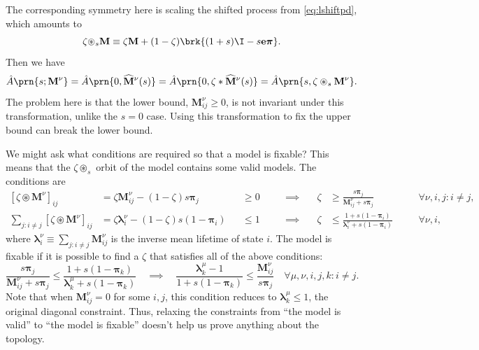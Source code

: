 \documentclass[12pt]{article}
\newcommand{\onev}{\mathbf{e}}
\newcommand{\eq}{\pib}
\newcommand{\pib}{\boldsymbol{\pi}}
\newcommand{\lb}{\boldsymbol{\lambda}}
\newcommand{\M}{\mathbf{M}}
\newcommand{\shift}[1]{\widehat{#1}}
\begin{document}
The corresponding symmetry here is scaling the shifted process from \cref{eq:lshiftpd}, which amounts to
%
\begin{equation}\label{eq:shiftscale}
  \zeta {\circledast}_{s} \M 
      \equiv \zeta \M
      + (1 - \zeta) \brk{(1 + s)\I - s \onev \eq} .
\end{equation}
%
Then we have
%
\begin{equation}\label{eq:lshiftscale}
  \hat{A} \prn{s; \M^\nu} 
    = \hat{A} \prn{0, \shift{\M}^\nu(s)}
    = \hat{A} \prn{0, \zeta * \shift{\M}^\nu(s)}
    = \hat{A} \prn{s, \zeta \circledast_s \M^\nu}.
\end{equation}
%
The problem here is that the lower bound, \(\M^\nu_{ij} \geq 0\), 
is not invariant under this transformation, unlike the \(s = 0\) case.
Using this transformation to fix the upper bound can break the lower bound.

We might ask what conditions are required so that a model is fixable?
This means that the \(\zeta \circledast_s \) orbit of the model contains some valid models.
The conditions are
%
\begin{equation*}
\begin{alignedat}{5}
  [\zeta \circledast \M^\nu]_{ij}  
    &= \zeta \M^\nu_{ij} - (1-\zeta) s \eq_j 
    &&\geq 0 &
  \quad &\implies \quad &
  \zeta &\geq \frac{s \eq_j}{\M^\nu_{ij} + s \eq_j} &
    &\forall \nu, i, j : i \neq j , \\
  \sum_{j : i \neq j} [\zeta \circledast \M^\nu]_{ij} 
    &= \zeta \lb^\nu_i - (1-\zeta) s (1-\eq_i) 
    &&\leq 1 &
  &\implies &
  \zeta &\leq \frac{1 + s (1-\eq_i)}{\lb^\nu_i + s (1-\eq_i)} &
    \quad &\forall \nu, i ,
\end{alignedat}
\end{equation*}
%
where \(\lb^\nu_i \equiv \sum_{j : i \neq j} \M^\nu_{ij}\) is the inverse mean  lifetime of state \(i\).
The model is fixable if it is possible to find a \(\zeta\) that satisfies all of the above conditions:
%
\begin{equation}\label{eq:fixable}
  \frac{s \eq_j}{\M^\nu_{ij} + s \eq_j} \leq \frac{1 + s (1-\eq_k)}{\lb^\mu_k + s (1-\eq_k)}
  \quad \implies \quad
  \frac{\lb^\mu_k - 1}{1 + s (1-\eq_k)} \leq \frac{\M^\nu_{ij}}{s \eq_j} 
  \quad \forall \mu, \nu, i, j, k : i \neq j.
\end{equation}
%
Note that when \(\M^\nu_{ij} = 0\) for some \(i,j \), this condition reduces to \(\lb^\mu_k \leq 1\), the original diagonal constraint.
Thus, relaxing the constraints from ``the model is valid'' to ``the model is fixable'' doesn't help us prove anything about the topology.
\end{document}
